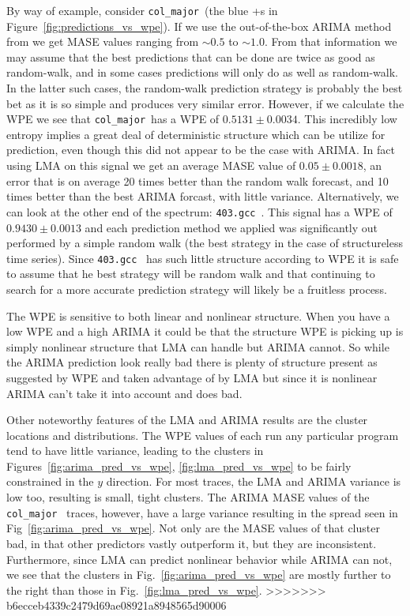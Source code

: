\documentclass{article}
\newcommand{\gcc}{{\tt 403.gcc}~}
\newcommand{\col}{{\tt col\_major}~}
\begin{document}
By way of example, consider \col (the blue +s in
Figure~\ref{fig:predictions_vs_wpe}). If we use the out-of-the-box ARIMA method
from \cite{ARIMA-autofit} we get MASE values ranging from $\sim0.5$ to
$\sim1.0$. From that information we may assume that the best predictions that
can be done are twice as good as random-walk, and in some cases predictions will
only do as well as random-walk. In the latter such cases, the random-walk
prediction strategy is probably the best bet as it is so simple and produces
very similar error. However, if we calculate the WPE we see that \col has a WPE
of $0.5131 \pm 0.0034$. This incredibly low entropy implies a great deal of
deterministic structure which can be utilize for prediction, even though this
did not appear to be the case with ARIMA. In fact using LMA on this signal we
get an average MASE value of $0.05\pm0.0018$, an error that is on average 20
times better than the random walk forecast, and 10 times better than the best
ARIMA forcast, with little variance. Alternatively, we can look at the other end
of the spectrum: \gcc. This signal has a WPE of $0.9430\pm0.0013$ and each
prediction method we applied was significantly out performed by a simple random
walk (the best strategy in the case of structureless time series). Since \gcc
has such little structure according to WPE it is safe to assume that he best
strategy will be random walk and that continuing to search for a more accurate
prediction strategy will likely be a fruitless process.

The WPE is sensitive to both linear and nonlinear structure. When you have a low
WPE and a high ARIMA it could be that the structure WPE is picking up is simply
nonlinear structure that LMA can handle but ARIMA cannot. So while the ARIMA
prediction look really bad there is plenty of structure present as suggested by
WPE and taken advantage of by LMA but since it is nonlinear ARIMA can't take it
into account and does bad.

Other noteworthy features of the LMA and ARIMA results are the cluster locations
and distributions. The WPE values of each run any particular program tend to
have little variance, leading to the clusters in
Figures~\ref{fig:arima_pred_vs_wpe}, \ref{fig:lma_pred_vs_wpe} to be fairly
constrained in the $y$ direction. For most traces, the LMA and ARIMA variance is
low too, resulting is small, tight clusters. The ARIMA MASE values of the \col
traces, however, have a large variance resulting in the spread seen in
Fig~\ref{fig:arima_pred_vs_wpe}. Not only are the MASE values of that cluster
bad, in that other predictors vastly outperform it, but they are inconsistent.
Furthermore, since LMA can predict nonlinear behavior while ARIMA can not, we
see that the clusters in Fig.~\ref{fig:arima_pred_vs_wpe} are mostly further to
the right than those in Fig.~\ref{fig:lma_pred_vs_wpe}.
>>>>>>> b6ecceb4339c2479d69ae08921a8948565d90006
\end{document}
